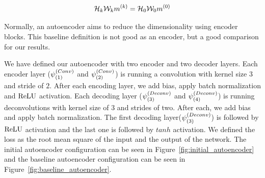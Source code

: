 $$ \mathcal{H}_{k}  \mathcal{W}_{k} m^{(k)} = \mathcal{H}_{0} \mathcal{W}_{0}  m^{(0)} $$

Normally, an autoencoder aims to reduce the dimensionality using encoder blocks. This baseline definition is not good as an encoder, but a good comparison for our results.

We have defined our autoencoder with two encoder and two decoder layers. Each encoder layer ($\psi^{(Conv)}_{(1)}$ and $\psi^{(Conv)}_{(2)}$) is running a convolution with kernel size $3$ and stride of $2$. After each encoding layer, we add bias, apply batch normalization and $\textrm{ReLU}$ activation. Each decoding layer ($\psi^{(Deconv)}_{(3)}$ and $\psi^{(Deconv)}_{(4)}$) is running deconvolutions with kernel size of 3 and strides of two. After each, we add bias and apply batch normalization. The first decoding layer($\psi^{(Deconv)}_{(3)}$) is followed by $\textrm{ReLU}$ activation and the last one is followed by $tanh$ activation. We defined the loss as the root mean square of the input and the output of the network. The initial autoencoder configuration can be seen in Figure~\ref{fig:initial_autoencoder} and the baseline autoencoder configuration can be seen in Figure~\ref{fig:baseline_autoencoder}.

